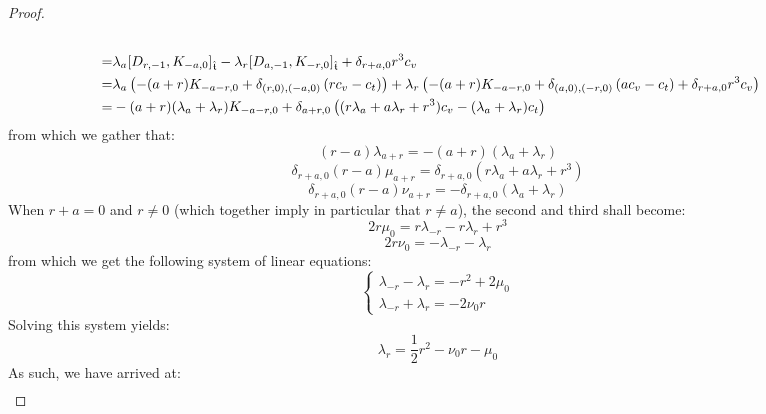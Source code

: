 \begin{proof}
$$\begin{aligned}
                            \\
                            = & \lambda_a [ D_{r, -1}, K_{-a, 0} ]_{\extendedtoroidal} -  \lambda_r [ D_{a, -1}, K_{-r, 0} ]_{\extendedtoroidal} + \delta_{r + a, 0} r^3 c_v
                            \\
                            = &
                            \lambda_a \left(
                                -(a + r) K_{-a - r, 0} + \delta_{(r, 0), (-a, 0)} \left( r c_v - c_t \right)
                            \right)
                            +
                            \lambda_r \left(
                                -(a + r) K_{-a - r, 0} + \delta_{(a, 0), (-r, 0)} \left( a c_v - c_t \right)
                            +
                            \delta_{r + a, 0} r^3 c_v
                            \right)
                            \\
                            = &
                            -(a + r) ( \lambda_a + \lambda_r ) K_{-a - r, 0}
                            +
                            \delta_{a + r, 0} \left( (r \lambda_a + a \lambda_r + r^3) c_v - (\lambda_a + \lambda_r)c_t \right)
                        \end{aligned}
                    $$
                from which we gather that:
                    $$(r - a) \lambda_{a + r} = -(a + r) ( \lambda_a + \lambda_r )$$
                    $$\delta_{r + a, 0} (r - a) \mu_{a + r} = \delta_{r + a, 0} (r \lambda_a + a \lambda_r + r^3)$$
                    $$\delta_{r + a, 0} (r - a) \nu_{a + r} = -\delta_{r + a, 0}(\lambda_a + \lambda_r)$$
                When $r + a = 0$ and $r \not = 0$ (which together imply in particular that $r \not = a$), the second and third shall become:
                    $$2r \mu_0 = r \lambda_{-r} - r\lambda_r + r^3$$
                    $$2r \nu_0 = -\lambda_{-r} - \lambda_r$$
                from which we get the following system of linear equations:
                    $$
                        \begin{cases}
                            \lambda_{-r} - \lambda_r = -r^2 + 2\mu_0
                            \\
                            \lambda_{-r} + \lambda_r = -2\nu_0 r
                        \end{cases}
                    $$
                Solving this system yields:
                    $$\lambda_r = \frac12 r^2 - \nu_0 r - \mu_0$$
                As such, we have arrived at:
                    $$
                        \begin{aligned}

\end{aligned}$$
\end{proof}
